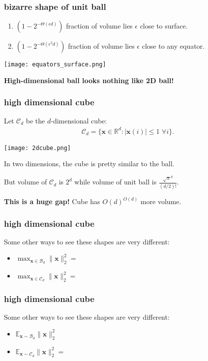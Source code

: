 \documentclass[compress]{beamer}
\newcommand{\bv}[1]{\mathbf{#1}}
\newcommand{\R}{\mathbb{R}}
\newcommand{\E}{\mathbb{E}}
\begin{document}
\begin{frame}[t]
	\frametitle{bizarre shape of unit ball}
	\begin{enumerate}
		\item $(1 -2^{-\Theta(\epsilon d)})$ fraction of volume lies $\epsilon$ close to surface. 
		\item $(1 - 2^{-\Theta(\epsilon^2 d)})$ fraction of volume lies $\epsilon$ close to any equator. 
	\end{enumerate}
	
	\begin{center}
		\texttt{[image: equators\_surface.png]}
		
		\alert{\textbf{High-dimensional ball looks nothing like 2D ball!}} 
	\end{center}
\end{frame}




\begin{frame}[t]
	\frametitle{high dimensional cube}
	Let $\mathcal{C}_d$ be the $d$-dimensional cube: 
	\begin{align*}
	\mathcal{C}_d = \{\bv{x}\in \R^d : |\bv{x}(i)| \leq 1 \,\, \forall i\}. 
	\end{align*}
	\begin{center}
		\vspace{-1em}
		\texttt{[image: 2dcube.png]}
		
		\vspace{-.5em}
		In two dimensions, the cube is pretty similar to the ball. 
		
			But volume of $\mathcal{C}_d$ is $2^d$ while volume of unit ball is $\frac{\sqrt{\pi}^{d}}{(d/2)!}.$ 
			
			\alert{\textbf{This is a huge gap!}} Cube has $O(d)^{O(d)}$ more volume.
	\end{center}
\end{frame}

\begin{frame}
	\frametitle{high dimensional cube}
	Some other ways to see these shapes are very different:
	\begin{itemize}
		\item $\max_{\bv{x} \in \mathcal{B}_d} \|\bv{x}\|_2^2 = $
		\item $\max_{\bv{x} \in \mathcal{C}_d} \|\bv{x}\|_2^2 = $
	\end{itemize}
\end{frame}

\begin{frame}
	\frametitle{high dimensional cube}
	Some other ways to see these shapes are very different:
	\begin{itemize}
		\item $\E_{\bv{x} \sim \mathcal{B}_d} \|\bv{x}\|_2^2 $
		\item $\E_{\bv{x} \sim \mathcal{C}_d} \|\bv{x}\|_2^2 = $
	\end{itemize}
\end{frame}
\end{document}
